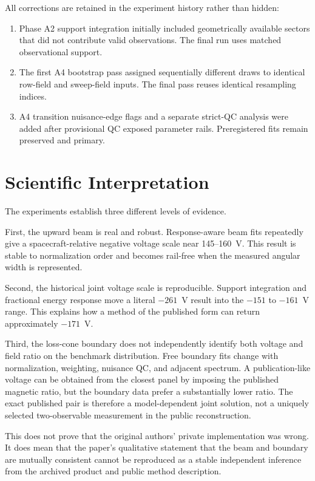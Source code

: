 \documentclass[11pt]{article}
\begin{document}
All corrections are retained in the experiment history rather than hidden:
\begin{enumerate}
  \item Phase A2 support integration initially included geometrically available
        sectors that did not contribute valid observations.  The final run uses
        matched observational support.
  \item The first A4 bootstrap pass assigned sequentially different draws to
        identical row-field and sweep-field inputs.  The final pass reuses
        identical resampling indices.
  \item A4 transition nuisance-edge flags and a separate strict-QC analysis were
        added after provisional QC exposed parameter rails.  Preregistered fits
        remain preserved and primary.
\end{enumerate}

\section{Scientific Interpretation}

The experiments establish three different levels of evidence.

First, the upward beam is real and robust.  Response-aware beam fits repeatedly
give a spacecraft-relative negative voltage scale near 145--160~V.  This result
is stable to normalization order and becomes rail-free when the measured angular
width is represented.

Second, the historical joint voltage scale is reproducible.  Support integration
and fractional energy response move a literal $-261$~V result into the
$-151$ to $-161$~V range.  This explains how a method of the published form can
return approximately $-171$~V.

Third, the loss-cone boundary does not independently identify both voltage and
field ratio on the benchmark distribution.  Free boundary fits change with
normalization, weighting, nuisance QC, and adjacent spectrum.  A
publication-like voltage can be obtained from the closest panel by imposing the
published magnetic ratio, but the boundary data prefer a substantially lower
ratio.  The exact published pair is therefore a model-dependent joint solution,
not a uniquely selected two-observable measurement in the public reconstruction.

This does not prove that the original authors' private implementation was wrong.
It does mean that the paper's qualitative statement that the beam and boundary
are mutually consistent cannot be reproduced as a stable independent inference
from the archived product and public method description.
\end{document}
